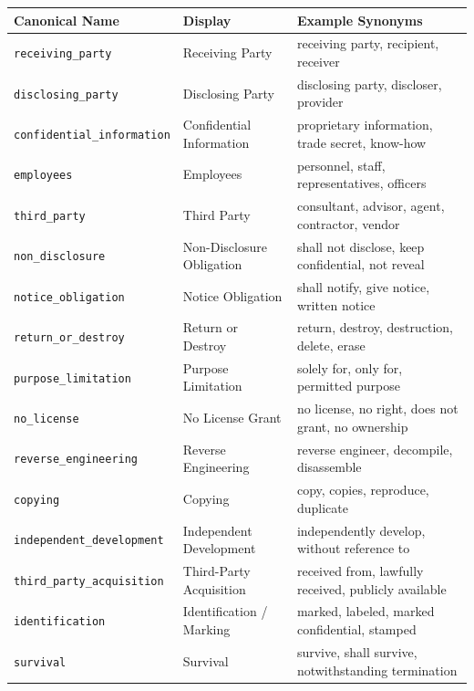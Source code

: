 \documentclass[11pt]{article}
\begin{document}
\begin{table}[h]
\centering
\small
\begin{tabular}{lll}
\hline
\textbf{Canonical Name} & \textbf{Display} & \textbf{Example Synonyms} \\
\hline
\texttt{receiving\_party}       & Receiving Party            & receiving party, recipient, receiver \\
\texttt{disclosing\_party}      & Disclosing Party           & disclosing party, discloser, provider \\
\texttt{confidential\_information} & Confidential Information & proprietary information, trade secret, know-how \\
\texttt{employees}              & Employees                  & personnel, staff, representatives, officers \\
\texttt{third\_party}           & Third Party                & consultant, advisor, agent, contractor, vendor \\
\texttt{non\_disclosure}        & Non-Disclosure Obligation  & shall not disclose, keep confidential, not reveal \\
\texttt{notice\_obligation}     & Notice Obligation          & shall notify, give notice, written notice \\
\texttt{return\_or\_destroy}    & Return or Destroy          & return, destroy, destruction, delete, erase \\
\texttt{purpose\_limitation}    & Purpose Limitation         & solely for, only for, permitted purpose \\
\texttt{no\_license}            & No License Grant           & no license, no right, does not grant, no ownership \\
\texttt{reverse\_engineering}   & Reverse Engineering        & reverse engineer, decompile, disassemble \\
\texttt{copying}                & Copying                    & copy, copies, reproduce, duplicate \\
\texttt{independent\_development} & Independent Development  & independently develop, without reference to \\
\texttt{third\_party\_acquisition} & Third-Party Acquisition & received from, lawfully received, publicly available \\
\texttt{identification}         & Identification / Marking   & marked, labeled, marked confidential, stamped \\
\texttt{survival}               & Survival                   & survive, shall survive, notwithstanding termination \\

\end{tabular}
\end{table}
\end{document}
